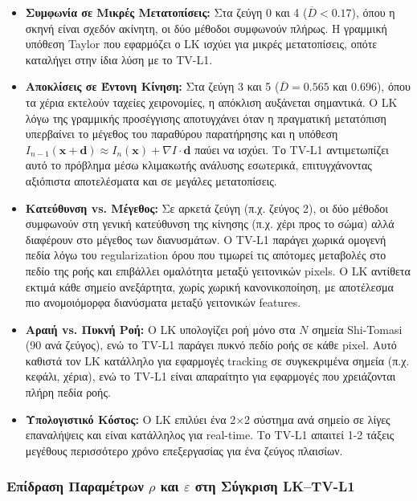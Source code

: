 \documentclass[12pt]{article}
\begin{document}
\begin{itemize}
    \item \textbf{Συμφωνία σε Μικρές Μετατοπίσεις:} Στα ζεύγη 0 και 4 ($\overline{D} < 0.17$), όπου η σκηνή είναι σχεδόν ακίνητη, οι δύο μέθοδοι συμφωνούν πλήρως. Η γραμμική υπόθεση Taylor που εφαρμόζει ο LK ισχύει για μικρές μετατοπίσεις, οπότε καταλήγει στην ίδια λύση με το TV-L1.

    \item \textbf{Αποκλίσεις σε Έντονη Κίνηση:} Στα ζεύγη 3 και 5 ($\overline{D} = 0.565$ και $0.696$), όπου τα χέρια εκτελούν ταχείες χειρονομίες, η απόκλιση αυξάνεται σημαντικά. Ο LK λόγω της γραμμικής προσέγγισης αποτυγχάνει όταν η πραγματική μετατόπιση υπερβαίνει το μέγεθος του παραθύρου παρατήρησης και η υπόθεση $I_{n-1}(\mathbf{x}+\mathbf{d}) \approx I_n(\mathbf{x}) + \nabla I \cdot \mathbf{d}$ παύει να ισχύει. Το TV-L1 αντιμετωπίζει αυτό το πρόβλημα μέσω κλιμακωτής ανάλυσης εσωτερικά, επιτυγχάνοντας αξιόπιστα αποτελέσματα και σε μεγάλες μετατοπίσεις.

    \item \textbf{Κατεύθυνση vs. Μέγεθος:} Σε αρκετά ζεύγη (π.χ. ζεύγος 2), οι δύο μέθοδοι συμφωνούν στη γενική κατεύθυνση της κίνησης (π.χ. χέρι προς το σώμα) αλλά διαφέρουν στο μέγεθος των διανυσμάτων. Ο TV-L1 παράγει χωρικά ομογενή πεδία λόγω του regularization όρου που τιμωρεί τις απότομες μεταβολές στο πεδίο της ροής και επιβάλλει ομαλότητα μεταξύ γειτονικών pixels. Ο LK αντίθετα εκτιμά κάθε σημείο ανεξάρτητα, χωρίς χωρική κανονικοποίηση, με αποτέλεσμα πιο ανομοιόμορφα διανύσματα μεταξύ γειτονικών features.

    \item \textbf{Αραιή vs. Πυκνή Ροή:} Ο LK υπολογίζει ροή μόνο στα $N$ σημεία Shi-Tomasi (90 ανά ζεύγος), ενώ το TV-L1 παράγει πυκνό πεδίο ροής σε κάθε pixel. Αυτό καθιστά τον LK κατάλληλο για εφαρμογές tracking σε συγκεκριμένα σημεία (π.χ. κεφάλι, χέρια), ενώ το TV-L1 είναι απαραίτητο για εφαρμογές που χρειάζονται πλήρη πεδία ροής.

    \item \textbf{Υπολογιστικό Κόστος:} Ο LK επιλύει ένα 2×2 σύστημα ανά σημείο σε λίγες επαναλήψεις και είναι κατάλληλος για real-time. Το TV-L1 απαιτεί 1-2 τάξεις μεγέθους περισσότερο χρόνο επεξεργασίας για ένα ζεύγος πλαισίων.
\end{itemize}

\subsubsection*{Επίδραση Παραμέτρων $\rho$ και $\varepsilon$ στη Σύγκριση LK--TV-L1}
\end{document}
